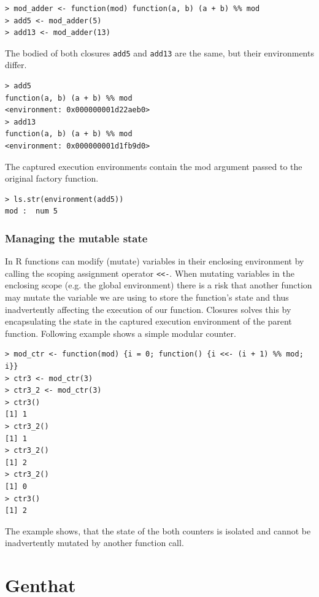 \documentclass[thesis=B,english]{FITthesis}[2012/10/20]
\begin{document}
\begin{verbatim}
> mod_adder <- function(mod) function(a, b) (a + b) %% mod
> add5 <- mod_adder(5)
> add13 <- mod_adder(13)
\end{verbatim}

The bodied of both closures \verb|add5| and \verb|add13| are the same, but their environments differ.

\begin{verbatim}
> add5
function(a, b) (a + b) %% mod
<environment: 0x000000001d22aeb0>
> add13
function(a, b) (a + b) %% mod
<environment: 0x000000001d1fb9d0>
\end{verbatim}

The captured execution environments contain the mod argument passed to the original factory function.

\begin{verbatim}
> ls.str(environment(add5))
mod :  num 5
\end{verbatim}

\subsection{Managing the mutable state} 
In R functions can modify (mutate) variables in their enclosing environment by calling the scoping assignment operator \verb|<<-|. When mutating variables in the enclosing scope (e.g. the global environment) there is a risk that another function may mutate the variable we are using to store the function’s state and thus inadvertently affecting the execution of our function. Closures solves this by encapsulating the state in the captured execution environment of the parent function. Following example shows a simple modular counter.

\begin{verbatim}
> mod_ctr <- function(mod) {i = 0; function() {i <<- (i + 1) %% mod; i}}
> ctr3 <- mod_ctr(3)
> ctr3_2 <- mod_ctr(3)
> ctr3()
[1] 1
> ctr3_2()
[1] 1
> ctr3_2()
[1] 2
> ctr3_2()
[1] 0
> ctr3()
[1] 2
\end{verbatim}

The example shows, that the state of the both counters is isolated and cannot be inadvertently mutated by another function call.

\chapter{Genthat} \label{chap:genthat}
\end{document}
